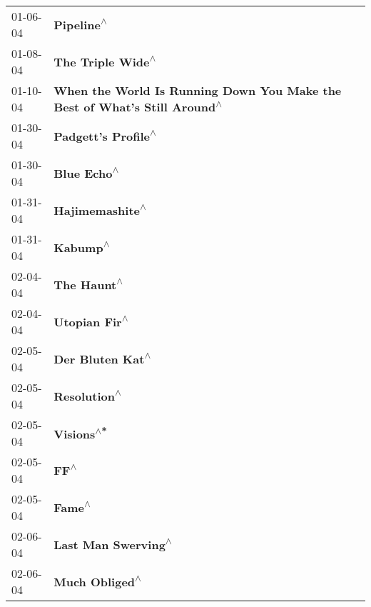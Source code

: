 \begin{supertabular}{p{0.25\columnwidth}p{0.75\columnwidth}}
 01-06-04 &                                                                 \textbf{Pipeline\textsuperscript{$\wedge$}} \\
 01-08-04 &                                                          \textbf{The Triple Wide\textsuperscript{$\wedge$}} \\
 01-10-04 &  \textbf{When the World Is Running Down You Make the Best of What's Still Around\textsuperscript{$\wedge$}} \\
 01-30-04 &                                                        \textbf{Padgett's Profile\textsuperscript{$\wedge$}} \\
 01-30-04 &                                                                \textbf{Blue Echo\textsuperscript{$\wedge$}} \\
 01-31-04 &                                                            \textbf{Hajimemashite\textsuperscript{$\wedge$}} \\
 01-31-04 &                                                                   \textbf{Kabump\textsuperscript{$\wedge$}} \\
 02-04-04 &                                                                \textbf{The Haunt\textsuperscript{$\wedge$}} \\
 02-04-04 &                                                              \textbf{Utopian Fir\textsuperscript{$\wedge$}} \\
 02-05-04 &                                                           \textbf{Der Bluten Kat\textsuperscript{$\wedge$}} \\
 02-05-04 &                                                               \textbf{Resolution\textsuperscript{$\wedge$}} \\
 02-05-04 &                                                                 \textbf{Visions\textsuperscript{$\wedge$*}} \\
 02-05-04 &                                                                       \textbf{FF\textsuperscript{$\wedge$}} \\
 02-05-04 &                                                                     \textbf{Fame\textsuperscript{$\wedge$}} \\
 02-06-04 &                                                        \textbf{Last Man Swerving\textsuperscript{$\wedge$}} \\
 02-06-04 &                                                             \textbf{Much Obliged\textsuperscript{$\wedge$}} \\

\end{supertabular}
